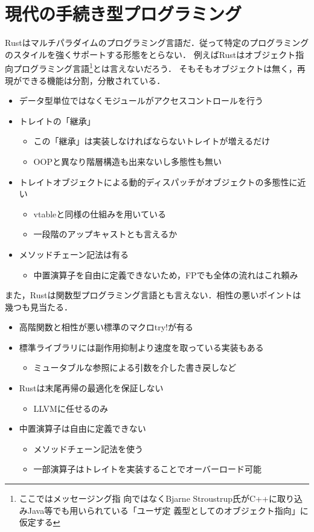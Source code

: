 \section{現代の手続き型プログラミング}
Rustはマルチパラダイムのプログラミング言語だ．従って特定のプログラミングのスタイルを強くサポートする形態をとらない．
例えばRustはオブジェクト指向プログラミング言語\footnote{ここではメッセージング指
  向ではなくBjarne Stroustrup氏がC++に取り込みJava等でも用いられている「ユーザ定
  義型としてのオブジェクト指向」に仮定する}とは言えないだろう．
そもそもオブジェクトは無く，再現ができる機能は分割，分散されている．
\begin{itemize}
\item データ型単位ではなくモジュールがアクセスコントロールを行う
\item トレイトの「継承」
  \begin{itemize}
  \item この「継承」は実装しなければならないトレイトが増えるだけ
  \item OOPと異なり階層構造も出来ないし多態性も無い
  \end{itemize}
\item トレイトオブジェクトによる動的ディスパッチがオブジェクトの多態性に近い
  \begin{itemize}
  \item vtableと同様の仕組みを用いている
  \item 一段階のアップキャストとも言えるか
  \end{itemize}
\item メソッドチェーン記法は有る
  \begin{itemize}
  \item 中置演算子を自由に定義できないため，FPでも全体の流れはこれ頼み
  \end{itemize}
\end{itemize}
また，Rustは関数型プログラミング言語とも言えない．相性の悪いポイントは幾つも見当たる．
\begin{itemize}
\item 高階関数と相性が悪い標準のマクロtry!が有る
\item 標準ライブラリには副作用抑制より速度を取っている実装もある
  \begin{itemize}
  \item ミュータブルな参照による引数を介した書き戻しなど
  \end{itemize}
\item Rustは末尾再帰の最適化を保証しない
  \begin{itemize}
  \item LLVMに任せるのみ
  \end{itemize}
\item 中置演算子は自由に定義できない
  \begin{itemize}
  \item メソッドチェーン記法を使う
  \item 一部演算子はトレイトを実装することでオーバーロード可能
  \end{itemize}
\end{itemize}

